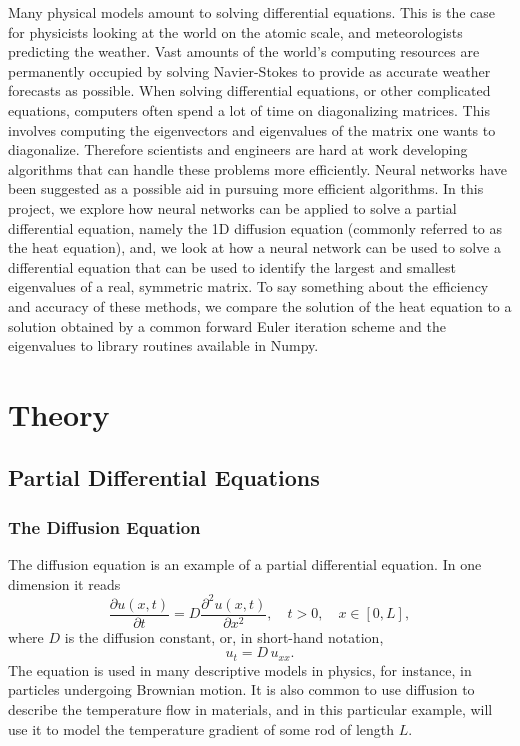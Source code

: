 \documentclass[a4paper, 
amsfonts, 
amssymb, 
amsmath, 
reprint, 
showkeys, 
nofootinbib, 
twoside]{revtex4-2}
\begin{document}
Many physical models amount to solving differential equations. This is the case for physicists looking at the world on the atomic scale, and meteorologists predicting the weather. Vast amounts of the world's computing resources are permanently occupied by solving Navier-Stokes to provide as accurate weather forecasts as possible. 
When solving differential equations, or other complicated equations, computers often spend a lot of time on diagonalizing matrices. This involves computing the eigenvectors and eigenvalues of the matrix one wants to diagonalize.
Therefore scientists and engineers are hard at work developing algorithms that can handle these problems more efficiently. Neural networks have been suggested as a possible aid in pursuing more efficient algorithms. In this project, we explore how neural networks can be applied to solve a partial differential equation, namely the 1D diffusion equation (commonly referred to as the heat equation), and, we look at how a neural network can be used to solve a differential equation that can be used to identify the largest and smallest eigenvalues of a real, symmetric matrix. To say something about the efficiency and accuracy of these methods, we compare the solution of the heat equation to a solution obtained by a common forward Euler iteration scheme and the eigenvalues to library routines available in Numpy.

\section{Theory}
 
\subsection{Partial Differential Equations}

\subsubsection{The Diffusion Equation}
The diffusion equation is an example of a partial differential equation.
In one dimension it reads
\begin{equation}
    \frac{\partial u(x, t)}{\partial t} = D\frac{\partial^2 u(x, t)}{\partial x^2}, \quad t > 0, \quad x \in [0, L],
\end{equation}
where $D$ is the diffusion constant, or, in short-hand notation, 
\begin{equation}
    u_t = D \, u_{xx}.
\end{equation}
The equation is used in many descriptive models in physics, for instance, in particles undergoing Brownian motion. It is also common to use diffusion to describe the temperature flow in materials, and in this particular example, will use it to model the temperature gradient of some rod of length $L$.
\end{document}
